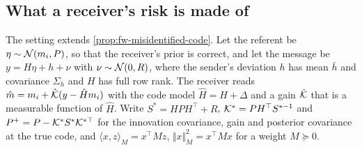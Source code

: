 \subsection{What a receiver's risk is made of}\label{sec:lrn-risk}

The setting extends \cref{prop:fw-misidentified-code}. Let the referent be $\eta\sim\mathcal{N}(m_i,P)$, so that the receiver's prior is correct, and let the message be $y=H\eta+h+\nu$ with $\nu\sim\mathcal{N}(0,R)$, where the sender's deviation $h$ has mean $\bar h$ and covariance $\Sigma_h$ and $H$ has full row rank. The receiver reads $\hat m=m_i+\hat{\mathcal{K}}(y-\hat Hm_i)$ with the code model $\hat H=H+\Delta$ and a gain $\hat{\mathcal{K}}$ that is a measurable function of $\hat H$. Write $S^\ast=HPH^\top+R$, $\mathcal{K}^\ast=PH^\top S^{\ast-1}$ and $P^+=P-\mathcal{K}^\ast S^\ast\mathcal{K}^{\ast\top}$ for the innovation covariance, gain and posterior covariance at the true code, and $\langle x,z\rangle_M=x^\top Mz$, $\Vert x\Vert_M^2=x^\top Mx$ for a weight $M\succeq0$.

